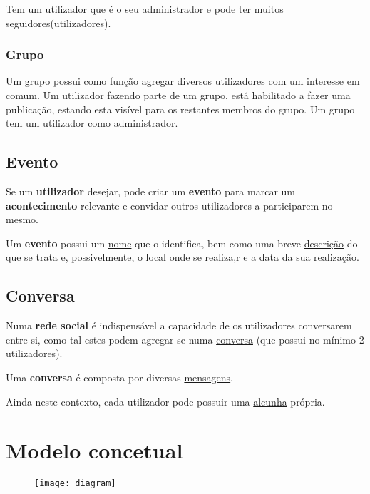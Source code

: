 \documentclass{report}
\begin{document}
Tem um \underline{utilizador} que é o seu administrador e pode ter muitos seguidores(utilizadores).

\subsection{Grupo}

Um grupo possui como função agregar diversos utilizadores com um interesse em comum. Um utilizador fazendo parte de um grupo, está habilitado a fazer uma publicação, estando esta visível para os restantes membros do grupo. Um grupo tem um utilizador como administrador.

\section{Evento}

Se um \textbf{utilizador} desejar, pode criar um \textbf{evento} para marcar um \textbf{acontecimento} relevante e convidar outros utilizadores a participarem no mesmo. \par

Um \textbf{evento} possui um \underline{nome} que o identifica, bem como uma breve \underline{descrição} do que se trata e, possivelmente, o local onde se realiza,r e a \underline{data} da sua realização.

\section{Conversa}

Numa \textbf{rede social} é indispensável a capacidade de os utilizadores conversarem entre si, como tal estes podem agregar-se numa \underline{conversa} (que possui no mínimo 2 utilizadores). \par

Uma \textbf{conversa} é composta por diversas \underline{mensagens}. \par

Ainda neste contexto, cada utilizador pode possuir uma \underline{alcunha} própria.

\chapter{Modelo concetual}

\begin{figure}[h!]
    \centering
    \texttt{[image: diagram]}
\end{figure}
\end{document}
